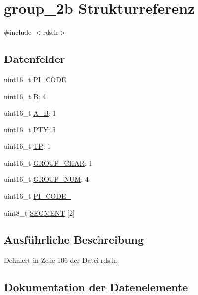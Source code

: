 \hypertarget{structgroup__2b}{}\section{group\+\_\+2b Strukturreferenz}
\label{structgroup__2b}


{\ttfamily \#include $<$rds.\+h$>$}

\subsection*{Datenfelder}
\begin{DoxyCompactItemize}
\item 
uint16\+\_\+t \hyperlink{structgroup__2b_a5cd9b1f6413028425796c1129aa8fd87}{P\+I\+\_\+\+C\+O\+D\+E}
\item 
uint16\+\_\+t \hyperlink{structgroup__2b_ae783bd90764c8455228772c025c064e4}{B}\+: 4
\item 
uint16\+\_\+t \hyperlink{structgroup__2b_a226eb9a4ec1152d0c92ce7324916ad56}{A\+\_\+\+B}\+: 1
\item 
uint16\+\_\+t \hyperlink{structgroup__2b_a0474967478fbbc2c71b800d2e0132d45}{P\+T\+Y}\+: 5
\item 
uint16\+\_\+t \hyperlink{structgroup__2b_ab9e634c63b0d95a96716d5f6d7f06d72}{T\+P}\+: 1
\item 
uint16\+\_\+t \hyperlink{structgroup__2b_a66d4119990dc4c3e040a43885e9bb953}{G\+R\+O\+U\+P\+\_\+\+C\+H\+A\+R}\+: 1
\item 
uint16\+\_\+t \hyperlink{structgroup__2b_a9f692e9f76ee88348d426bcd4e9bc70b}{G\+R\+O\+U\+P\+\_\+\+N\+U\+M}\+: 4
\item 
uint16\+\_\+t \hyperlink{structgroup__2b_ae86fed9d07832a5c3cc36d5aaa064bcb}{P\+I\+\_\+\+C\+O\+D\+E\+\_}
\item 
uint8\+\_\+t \hyperlink{structgroup__2b_ad4b043906241d98e6b480a31f1438352}{S\+E\+G\+M\+E\+N\+T} \mbox{[}2\mbox{]}
\end{DoxyCompactItemize}


\subsection{Ausführliche Beschreibung}


Definiert in Zeile 106 der Datei rds.\+h.



\subsection{Dokumentation der Datenelemente}
\hypertarget{structgroup__2b_a226eb9a4ec1152d0c92ce7324916ad56}{}
